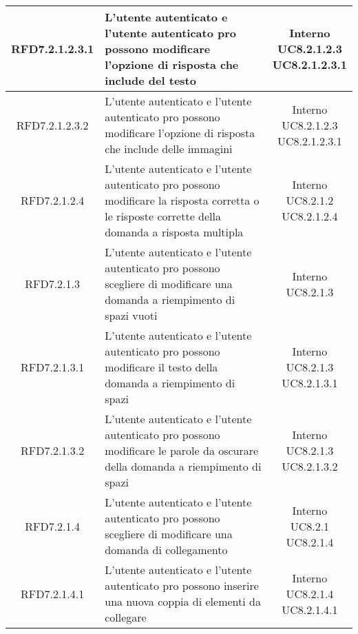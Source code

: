 \begin{longtable}{|c|>{\centering}m{7cm}|c|}
			 \hypertarget{{RFD7.2.1.2.3.1}}{{RFD7.2.1.2.3.1}} & L’utente autenticato e l'utente autenticato pro possono modificare l’opzione di risposta che include del testo & \makecell{Interno\\ UC8.2.1.2.3 \\UC8.2.1.2.3.1 } \\ \hline
			 \hypertarget{{RFD7.2.1.2.3.2}}{{RFD7.2.1.2.3.2}} & L’utente autenticato e l'utente autenticato pro possono modificare l’opzione di risposta che include delle immagini & \makecell{Interno\\ UC8.2.1.2.3 \\UC8.2.1.2.3.1 } \\ \hline
			 \hypertarget{{RFD7.2.1.2.4}}{{RFD7.2.1.2.4}} & L’utente autenticato e l’utente autenticato pro possono modificare la risposta corretta o le risposte corrette della domanda a risposta multipla & \makecell{Interno\\ UC8.2.1.2 \\UC8.2.1.2.4 } \\ \hline
			 \hypertarget{{RFD7.2.1.3}}{{RFD7.2.1.3}} & L’utente autenticato e l’utente autenticato pro possono scegliere di modificare una domanda a riempimento di spazi vuoti & \makecell{Interno\\ UC8.2.1.3 } \\ \hline
			 \hypertarget{{RFD7.2.1.3.1}}{{RFD7.2.1.3.1}} & L’utente autenticato e l'utente autenticato pro possono modificare il testo della domanda a riempimento di spazi & \makecell{Interno\\ UC8.2.1.3 \\UC8.2.1.3.1 } \\ \hline
			 \hypertarget{{RFD7.2.1.3.2}}{{RFD7.2.1.3.2}} & L’utente autenticato e l'utente autenticato pro possono modificare le parole da oscurare della domanda a riempimento di spazi  & \makecell{Interno\\ UC8.2.1.3 \\UC8.2.1.3.2 } \\ \hline
			 \hypertarget{{RFD7.2.1.4}}{{RFD7.2.1.4}} & L’utente autenticato e l’utente autenticato pro possono scegliere di modificare una domanda di collegamento & \makecell{Interno\\ UC8.2.1 \\UC8.2.1.4 } \\ \hline
			 \hypertarget{{RFD7.2.1.4.1}}{{RFD7.2.1.4.1}} & L’utente autenticato e l'utente autenticato pro possono inserire una nuova coppia di elementi da collegare & \makecell{Interno\\ UC8.2.1.4 \\UC8.2.1.4.1 } \\ \hline

\end{longtable}
